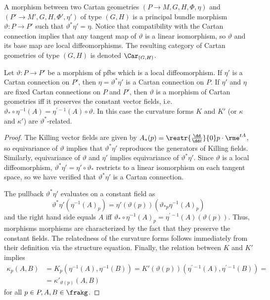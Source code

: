 \begin{defn}
    A morphism between two Cartan geometries $(P\to M,G,H,\Phi,\eta)$ and $(P'\to M',G,H,\Phi',\eta') $ of type $(G,H)$ is a principal bundle morphism $\vartheta:P\to P'$ such that $\vartheta^\ast\eta '=\eta$. Notice that compatibility with the Cartan connection implies that any tangent map of $\vartheta$ is a linear isomorphism, so $\vartheta$ and its base map are local diffeomorphisms. The resulting category of Cartan geometries of type $(G,H)$ is denoted $\Car_{(G,H)}$.
\end{defn}

\begin{lem}\label{lem 1.5.2 Cap}
    Let $\vartheta:P\to P'$ be a morphism of \glspl{pfb} which is a local diffeomorphism. If $\eta'$ is a Cartan connection on $P'$, then $\eta=\vartheta^\ast\eta'$ is a Cartan connection on $P$. If $\eta'$ and $\eta$ are fixed Cartan connections on $P$ and $P'$, then $\vartheta$ is a morphism of Cartan geometries iff it preserves the constant vector fields, i.e.\ $\vartheta_\ast\circ \eta^{-1}(A)=\eta^{\prime-1}(A)\circ\vartheta$. In this case the curvature forms $K$ and $K'$ (or $\kappa$ and $\kappa'$) are $\vartheta^\ast$-related.
\end{lem}
\begin{proof}
    The Killing vector fields are given by $A_\ast(p)=\restr{\frac{\dd}{\dd t}}{0}p\cdot \rme^{tA}$, so equivariance of $\vartheta$ implies that $\vartheta^\ast \eta'$ reproduces the generators of Killing fields. Similarly, equivariance of $\vartheta$ and $\eta'$ implies equivariance of $\vartheta^\ast\eta'$. Since $\vartheta$ is a local diffeomorphism, $\vartheta^\ast\eta'=\eta'\circ \vartheta_\ast$ restricts to a linear isomorphism on each tangent space, so we have verified that $\vartheta^\ast\eta'$ is a Cartan connection.

    The pullback $\vartheta^\ast\eta'$ evaluates on a constant field as 
    \[\vartheta^\ast\eta'(\eta^{-1}(A)_p)=\eta'(\vartheta(p))\left(\vartheta_{\ast p}\eta^{-1}(A)_p\right)\]
    and the right hand side equals $A$ iff $\vartheta_\ast\circ \eta^{-1}(A)_p=\eta^{\prime-1}(A)(\vartheta(p))$. Thus, morphisms morphisms are characterized by the fact that they preserve the constant fields. The relatedness of the curvature forms follows immediately from their definition via the structure equation. Finally, the relation between $K$ and $K'$ implies 
    \begin{align}
        \kappa_p(A,B)&=K_p\left(\eta^{-1}(A),\eta^{-1}(B)\right)=K'(\vartheta(p))\left(\eta^{\prime-1}(A),\eta^{\prime-1}(B)\right)=\\&=\kappa'_{\vartheta(p)}(A,B)
    \end{align}
    for all $p\in P, A,B\in\frakg$.
\end{proof}


